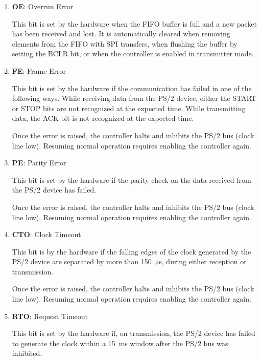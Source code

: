\documentclass[]{article}
\begin{document}
\begin{description}[style=nextline]
\begin{enumerate}[
            label=\emph{Bit \arabic*}, widest=s 15:8,
            left=\parindent, align=left,
            itemsep=2.5\itemsep,
            start=0
        ]
            \item \textbf{OE}: Overrun Error
            
            This bit is set by the hardware when the FIFO buffer is full and a new packet has been received and lost. It is automatically cleared when removing elements from the FIFO with SPI transfers, when flushing the buffer by setting the BCLR bit, or when the controller is enabled in transmitter mode.
            
            \item \textbf{FE}: Frame Error
    
            This bit is set by the hardware if the communication has failed in one of the following ways. While receiving data from the PS/2 device, either the START or STOP bits are not recognized at the expected time. While transmitting data, the ACK bit is not recognized at the expected time.
            
            Once the error is raised, the controller halts and inhibits the PS/2 bus (clock line low). Resuming normal operation requires enabling the controller again.
            
            \item \textbf{PE}: Parity Error
            
            This bit is set by the hardware if the parity check on the data received from the PS/2 device has failed.
            
            Once the error is raised, the controller halts and inhibits the PS/2 bus (clock line low). Resuming normal operation requires enabling the controller again.
            
            \item \textbf{CTO}: Clock Timeout
    
            This bit is by the hardware if the falling edges of the clock generated by the PS/2 device are separated by more than \qty{150}{\micro\s}, during either reception or transmission.
            
            Once the error is raised, the controller halts and inhibits the PS/2 bus (clock line low). Resuming normal operation requires enabling the controller again.
            
            \item \textbf{RTO}: Request Timeout
    
            This bit is set by the hardware if, on transmission, the PS/2 device has failed to generate the clock within a \qty{15}{\milli\s} window after the PS/2 bus was inhibited.
    

\end{enumerate}
\end{description}
\end{document}
